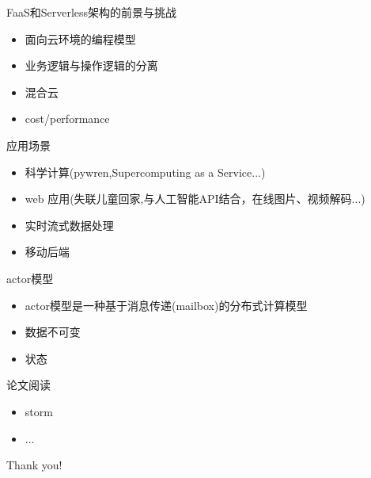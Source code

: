 \documentclass{beamer}
\begin{document}
    \begin{frame}FaaS和Serverless架构的前景与挑战
        \begin{itemize}
        	\item 面向云环境的编程模型
        	\item 业务逻辑与操作逻辑的分离
        	\item 混合云
        	\item cost/performance
        \end{itemize}
    \end{frame}
    
    \begin{frame}应用场景
        \begin{itemize}
        	\item 科学计算(pywren,Supercomputing as a Service...)
        	\item web 应用(失联儿童回家,与人工智能API结合，在线图片、视频解码...)
        	\item 实时流式数据处理
        	\item 移动后端
        \end{itemize}
    \end{frame}

    \begin{frame}actor模型
         \begin{itemize}
        	\item actor模型是一种基于消息传递(mailbox)的分布式计算模型
        	\item 数据不可变
        	\item 状态
         \end{itemize}
    \end{frame}
        
    \begin{frame}论文阅读
        \begin{itemize}
        	\item storm
        	\item ...
        \end{itemize}
    \end{frame}
    
    \begin{frame}
        \centering Thank you!
    \end{frame}
\end{document}
